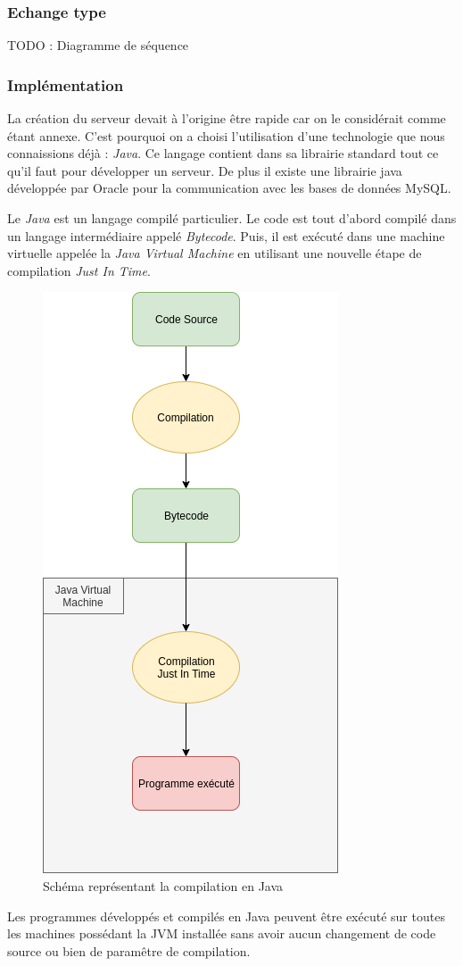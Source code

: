 \subsubsection{Echange type}
TODO : Diagramme de séquence

\subsubsection{Implémentation}
La création du serveur devait à l'origine être rapide car on le considérait comme étant annexe. C'est pourquoi on a choisi l'utilisation d'une
technologie que nous connaissions déjà : \emph{Java}. Ce langage contient dans sa librairie standard tout ce qu'il faut pour développer un serveur.
De plus il existe une librairie java développée par Oracle pour la communication avec les bases de données MySQL.

Le \emph{Java} est un langage compilé particulier. Le code est tout d'abord compilé dans un langage intermédiaire appelé \emph{Bytecode}. 
Puis, il est exécuté dans une machine virtuelle appelée la \emph {Java Virtual Machine} en utilisant une nouvelle étape de compilation \emph {Just In Time}.
\par
\begin{figure}[ht]
    \label{Schéma compilation Java}
    \centering
    \includegraphics[scale=0.5]{images/java_compilation.png}
    \caption{Schéma représentant la compilation en Java}
\end{figure}
Les programmes développés et compilés en Java peuvent être exécuté sur toutes les machines possédant la JVM installée sans avoir aucun changement de code source ou bien de paramêtre de compilation.
